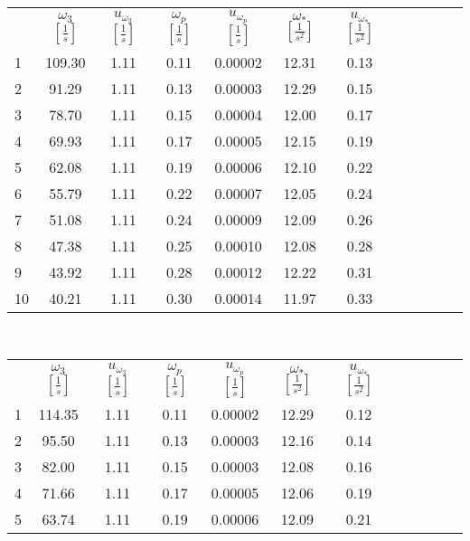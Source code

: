 \begin{center}
    \begin{tabular}{gccccccccccc}
         &      $\omega_3$ $[\frac{1}{s}]$ &  $u_{\omega_3}$ $[\frac{1}{s}]$ &    $\omega_p$ $[\frac{1}{s}]$ &     $u_{\omega_p}$ $[\frac{1}{s}]$ &     $\omega_*$ $[\frac{1}{s^2}]$&  $u_{\omega_*}$ $[\frac{1}{s^2}]$\\
        1  &  109.30 &  1.11 &  0.11 &  0.00002 &  12.31 &  0.13 \\
        2  &   91.29 &  1.11 &  0.13 &  0.00003 &  12.29 &  0.15 \\
        3  &   78.70 &  1.11 &  0.15 &  0.00004 &  12.00 &  0.17 \\
        4  &   69.93 &  1.11 &  0.17 &  0.00005 &  12.15 &  0.19 \\
        5  &   62.08 &  1.11 &  0.19 &  0.00006 &  12.10 &  0.22 \\
        6  &   55.79 &  1.11 &  0.22 &  0.00007 &  12.05 &  0.24 \\
        7  &   51.08 &  1.11 &  0.24 &  0.00009 &  12.09 &  0.26 \\
        8  &   47.38 &  1.11 &  0.25 &  0.00010 &  12.08 &  0.28 \\
        9  &   43.92 &  1.11 &  0.28 &  0.00012 &  12.22 &  0.31 \\
        10 &   40.21 &  1.11 &  0.30 &  0.00014 &  11.97 &  0.33 \\
    \end{tabular}\\
    \begin{tabular}{gccccccccccc}
         &      $\omega_3$ $[\frac{1}{s}]$ &  $u_{\omega_3}$ $[\frac{1}{s}]$ &    $\omega_p$ $[\frac{1}{s}]$ &     $u_{\omega_p}$ $[\frac{1}{s}]$ &     $\omega_*$ $[\frac{1}{s^2}]$&  $u_{\omega_*}$ $[\frac{1}{s^2}]$\\
        1 &  114.35 &  1.11 &  0.11 &  0.00002 &  12.29 &  0.12 \\     
        2 &   95.50 &  1.11 &  0.13 &  0.00003 &  12.16 &  0.14 \\     
        3 &   82.00 &  1.11 &  0.15 &  0.00003 &  12.08 &  0.16 \\     
        4 &   71.66 &  1.11 &  0.17 &  0.00005 &  12.06 &  0.19 \\     
        5 &   63.74 &  1.11 &  0.19 &  0.00006 &  12.09 &  0.21 \\
    \end{tabular}\\

\end{center}
